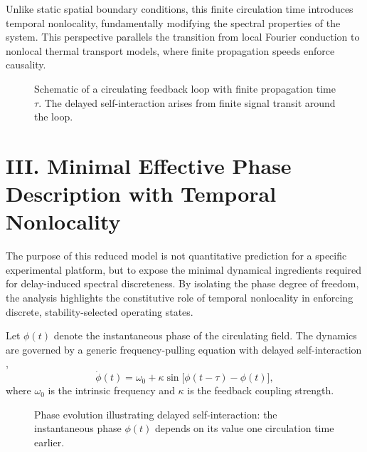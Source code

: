 \documentclass[11pt,a4paper]{article}
\begin{document}
Unlike static spatial boundary conditions, this finite circulation time introduces temporal nonlocality, fundamentally modifying the spectral properties of the system. This perspective parallels the transition from local Fourier conduction to nonlocal thermal transport models, where finite propagation speeds enforce causality.

\begin{figure}[h]
\centering
{}
\caption{Schematic of a circulating feedback loop with finite propagation time $\tau$. The delayed self-interaction arises from finite signal transit around the loop.}
\label{fig:circulation_loop}
\end{figure}

\section*{III. Minimal Effective Phase Description with Temporal Nonlocality}
The purpose of this reduced model is not quantitative prediction for a specific experimental platform, but to expose the minimal dynamical ingredients required for delay-induced spectral discreteness. By isolating the phase degree of freedom, the analysis highlights the constitutive role of temporal nonlocality in enforcing discrete, stability-selected operating states.

Let $\phi(t)$ denote the instantaneous phase of the circulating field. The dynamics are governed by a generic frequency-pulling equation with delayed self-interaction \cite{Yeung1999},
\begin{equation}
\dot{\phi}(t) = \omega_0 + \kappa \sin\big[\phi(t-\tau) - \phi(t)\big],
\end{equation}
where $\omega_0$ is the intrinsic frequency and $\kappa$ is the feedback coupling strength.

\begin{figure}[h]
\centering
{}
\caption{Phase evolution illustrating delayed self-interaction: the instantaneous phase $\phi(t)$ depends on its value one circulation time earlier.}
\label{fig:phase_feedback}
\end{figure}
\end{document}
